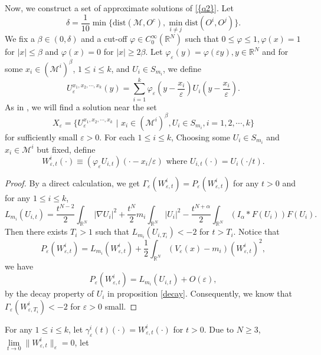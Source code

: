 \documentclass[12pt,reqno]{amsart}
\numberwithin{equation}{section}
\newtheorem{lemma}{Lemma}[section]
\begin{document}
\noindent Now, we construct a set of approximate solutions of {\eqref{{q2}}}. Let
$$
\delta=\frac{1}{10}\min\{\mbox{dist}(\mathcal{M},O^c),\min\limits_{i\not=j}\mbox{dist}(O^i,O^j)\}.
$$ We fix a $\beta\in (0,\delta)$ and a cut-off ${\varphi}\in C_0^\infty({\mathbb R^N})$ such that $0\le{\varphi}\le1,{\varphi}(x)=1$ for $|x|\le \beta$ and ${\varphi}(x)=0$ for $|x|\ge 2\beta$. Let ${\varphi}_{\varepsilon}(y)={\varphi}({\varepsilon} y), y\in{\mathbb R^N}$ and for some $x_i\in (\mathcal{M}^i)^{\beta}$, $1\le i\le k$, and $U_i\in S_{m_i}$, we define
$$
U_{\varepsilon}^{x_1,x_2,\cdots,x_k}(y)=\sum_{i=1}^k{\varphi}_{\varepsilon}\left(y-\frac{x_i}{\varepsilon}\right)U_i\left(y-\frac{x_i}{\varepsilon}\right).
$$
As in \cite{bj}, we will find a solution near the set
$$
X_{\varepsilon}=\{U_{\varepsilon}^{x_1,x_2,\cdots,x_k}\,\,|\,\,x_i\in (\mathcal{M}^i)^{\beta}, U_i\in S_{m_i},i=1,2,\cdots,k\}
$$
for sufficiently small ${\varepsilon}>0$. For each $1\le i\le k$, Choosing some $U_i\in S_{m_i}$ and $x_i\in\mathcal{M}^i$ but fixed, define
$$
W_{{\varepsilon},t}^i(\cdot)\equiv({\varphi}_{\varepsilon} U_{i,t})(\cdot-x_i/{\varepsilon})\, \, \mbox{where}\, \, U_{i,t}(\cdot)=U_i(\cdot/t).
$$
\begin{proof}
By a direct calculation, we get  ${\Gamma}_{\varepsilon}(W_{{\varepsilon},t}^i)=P_{\varepsilon}(W_{{\varepsilon},t}^i)$ for any $t>0$ and for any $1\le i\le k$,
$$
L_{m_i}(U_{i,t})=\frac{t^{N-2}}{2}\int_{\mathbb R^N}|\nabla U_i|^2+\frac{t^{N}}{2}m_i\int_{\mathbb R^N}|U_i|^2-\frac{t^{N+{\alpha}}}{2}\int_{\mathbb R^N}(I_{\alpha}\ast F(U_i))F(U_i).
$$
Then there exists $T_i>1$ such that $L_{m_i}(U_{i,T_i})<-2$ for $t>T_i$. Notice that
$$
P_{\varepsilon}(W_{{\varepsilon},t}^i)=L_{m_i}(W_{{\varepsilon},t}^i)+\frac12\int_{\mathbb R^N}(V_{\varepsilon}(x)-m_i)(W_{{\varepsilon},t}^i)^2,
$$
we have
$$
P_{\varepsilon}(W_{{\varepsilon},t}^i)=L_{m_i}(U_{i,t})+O({\varepsilon}),
$$
by the decay property of $U_{i}$ in proposition \ref{decay}. Consequently, we know that ${\Gamma}_{\varepsilon}(W_{{\varepsilon},T_i}^i)<-2$ for ${\varepsilon}>0$ small.
\end{proof}
For any $1\le i\le k$, let $\gamma_{\varepsilon}^i(t)(\cdot)=W_{{\varepsilon},t}^i(\cdot)$ for $t>0$. Due to $N\ge3$, $\lim\limits_{t\rightarrow0}\|W_{{\varepsilon},t}^i\|_{\varepsilon}=0$, let
\end{document}
